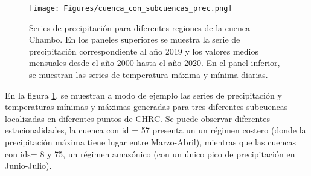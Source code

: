 \begin{figure}[h!]
  \begin{center}
    \texttt{[image: Figures/cuenca\_con\_subcuencas\_prec.png]}
    \caption{ Series de precipitación para diferentes regiones de la cuenca Chambo. En los paneles superiores  
    se muestra la serie de precipitación correspondiente al año 2019 y  los valores medios mensuales desde el año 2000 hasta 
    el año 2020. En el panel inferior, se muestran las series de temperatura máxima y mínima diarias.}
    \label{4}
  \end{center}
\end{figure}

En la figura \ref{4}, se muestran a modo de ejemplo las series de precipitación y temperaturas
mínimas y máximas generadas para tres diferentes subcuencas 
localizadas en diferentes puntos de CHRC. Se puede observar diferentes estacionalidades,
la cuenca con id = 57 presenta un  un régimen costero (donde la precipitación máxima tiene lugar entre Marzo-Abril), 
mientras que las cuencas con ids= 8 y 75, un régimen amazónico (con un único pico de precipitación en Junio-Julio).


